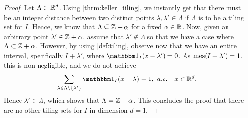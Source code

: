 \documentclass[../thesis.tex]{subfiles}
\begin{document}
\begin{proof}  %
    Let $\Lambda \subset \mathbb{R}^d$. Using \cref{thrm:keller_tiling}, we instantly get that there must be an integer distance between two distinct points $\lambda,\lambda' \in \Lambda$ if $\Lambda$ is to be a tiling set for $I$. Hence, we know that $\Lambda \subseteq \mathbb{Z} +\alpha$ for a fixed $\alpha\in \mathbb{R}$. Now, given an arbitrary point $\lambda' \in \mathbb{Z} +\alpha$, assume that $\lambda'\notin \Lambda$ so that we have a case where $\Lambda \subset \mathbb{Z}+\alpha$. However, by using \cref{def:tiling}, observe now that we have an entire interval, specifically $I+\lambda'$, where $\indicator{I}{x - \lambda'} = 0$. As $\operatorname{mes}(I+\lambda') = 1 $, this is non-negligible, and we do not achieve
    \begin{equation*}
        \sum_{\lambda \in \Lambda\setminus \braq{\lambda'}} \indicator{I}{x-\lambda} = 1, \text{\space} a.e. \quad x \in \R^d.
    \end{equation*}
    Hence $\lambda' \in \Lambda$, which shows that $\Lambda = \mathbb{Z}+\alpha$. This concludes the proof that there are no other tiling sets for $I$ in dimension $d=1$. %
\end{proof}
\end{document}
